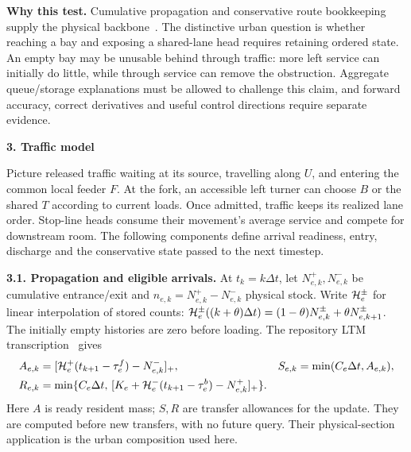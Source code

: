 \documentclass[10pt,a4paper]{article}
\newcommand{\pos}[1]{[#1]_+}
\newcommand{\head}[1]{\par\vspace{4pt}\noindent\textbf{#1}\par\nobreak\vspace{1pt}}
\begin{document}
\textbf{Why this test.} Cumulative propagation and conservative route
bookkeeping supply the physical backbone~\cite{m0,m1}. The distinctive
urban question is whether reaching a bay and exposing a shared-lane head
requires retaining ordered state. An empty bay may be unusable behind
through traffic: more left service can initially do little, while through
service can remove the obstruction. Aggregate queue/storage explanations
must be allowed to challenge this claim, and forward accuracy, correct
derivatives and useful control directions require separate evidence.

\newpage
\head{3. Traffic model}
Picture released traffic waiting at its source, travelling along $U$,
and entering the common local feeder $F$. At the fork, an accessible
left turner can choose $B$ or the shared $T$ according to current loads.
Once admitted, traffic keeps its realized lane order. Stop-line heads
consume their movement's average service and compete for downstream room.
The following components define arrival readiness, entry, discharge and
the conservative state passed to the next timestep.

\textbf{3.1. Propagation and eligible arrivals.}
At $t_k=k\Delta t$, let $N^+_{e,k},N^-_{e,k}$ be cumulative entrance/exit
and $n_{e,k}=N^+_{e,k}-N^-_{e,k}$ physical stock.
Write ${\cal H}^{\pm}_e$ for linear interpolation of stored counts:
${\cal H}^{\pm}_e((k+\theta)\Delta t)
=(1-\theta)N^\pm_{e,k}+\theta N^\pm_{e,k+1}$.
The initially empty histories are zero before loading.
The repository LTM transcription~\cite{m0} gives
\begin{align}
 A_{e,k}&=\pos{{\cal H}^+_e(t_{k+1}-\tau^f_e)-N^-_{e,k}},
 &S_{e,k}&=\min(C_e\Delta t,A_{e,k}),\label{eq:compact-sending}\\
 R_{e,k}&=\min\{C_e\Delta t,\,
 \pos{K_e+{\cal H}^-_e(t_{k+1}-\tau^b_e)-N^+_{e,k}}\}.
 \label{eq:compact-receiving}
\end{align}
Here $A$ is ready resident mass; $S,R$ are transfer allowances for the
update. They are computed before new transfers, with no future query.
Their physical-section application is the urban composition used here.
\end{document}
